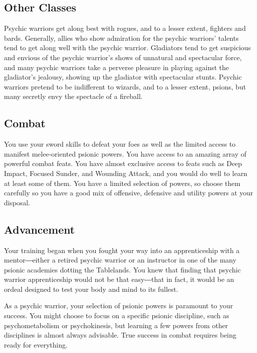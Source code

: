 \subsection{Other Classes}

Psychic warriors get along best with rogues, and to a lesser extent, fighters and bards. Generally, allies who show admiration for the psychic warriors’ talents tend to get along well with the psychic warrior. Gladiators tend to get suspicious and envious of the psychic warrior’s shows of unnatural and spectacular force, and many psychic warriors take a perverse pleasure in playing against the gladiator’s jealousy, showing up the gladiator with spectacular stunts. Psychic warriors pretend to be indifferent to wizards, and to a lesser extent, psions, but many secretly envy the spectacle of a fireball.

\subsection{Combat}

You use your sword skills to defeat your foes as well as the limited access to manifest melee‐oriented psionic powers. You have access to an amazing array of powerful combat feats. You have almost exclusive access to feats such as Deep Impact, Focused Sunder, and Wounding Attack, and you would do well to learn at least some of them. You have a limited selection of powers, so choose them carefully so you have a good mix of offensive, defensive and utility powers at your disposal.

\subsection{Advancement}

Your training began when you fought your way into an apprenticeship with a mentor―either a retired psychic warrior or an instructor in one of the many psionic academies dotting the Tablelands. You knew that finding that psychic warrior apprenticeship would not be that easy―that in fact, it would be an ordeal designed to test your body and mind to its fullest.

As a psychic warrior, your selection of psionic powers is paramount to your success. You might choose to focus on a specific psionic discipline, such as psychometabolism or psychokinesis, but learning a few powers from other disciplines is almost always advisable. True success in combat requires being ready for everything.

